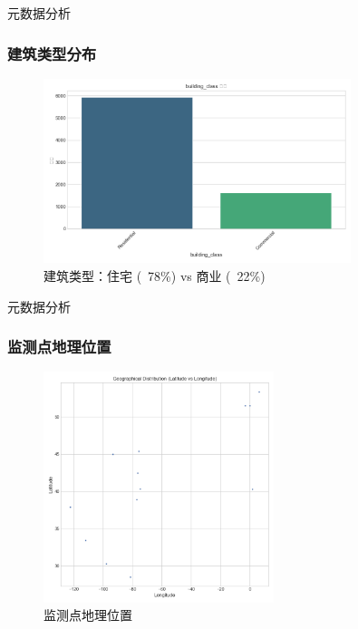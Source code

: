 \documentclass{beamer} %
\begin{document}
\begin{frame}{元数据分析}
    \frametitle{建筑类型分布}
    \begin{figure}
        \centering
        \includegraphics[width=0.8\textwidth]{../plots/metadata_dist_building_class.png}
        \caption{建筑类型：住宅 (~78\%) vs 商业 (~22\%)}
    \end{figure}
\end{frame}

\begin{frame}{元数据分析}
    \frametitle{监测点地理位置}
    \begin{figure}
        \centering
        \includegraphics[width=0.6\textwidth]{../plots/metadata_location_scatter.png}
        \caption{监测点地理位置}
    \end{figure}
\end{frame}
\end{document}
